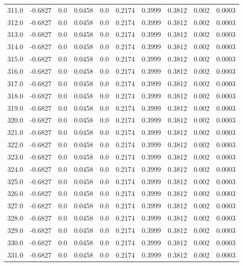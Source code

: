 \begin{longtable}{lrrrrrrrrr}
311.0 & -0.6827 & 0.0 & 0.0458 & 0.0 & 0.2174 & 0.3999 & 0.3812 & 0.002 & 0.0003 \\
312.0 & -0.6827 & 0.0 & 0.0458 & 0.0 & 0.2174 & 0.3999 & 0.3812 & 0.002 & 0.0003 \\
313.0 & -0.6827 & 0.0 & 0.0458 & 0.0 & 0.2174 & 0.3999 & 0.3812 & 0.002 & 0.0003 \\
314.0 & -0.6827 & 0.0 & 0.0458 & 0.0 & 0.2174 & 0.3999 & 0.3812 & 0.002 & 0.0003 \\
315.0 & -0.6827 & 0.0 & 0.0458 & 0.0 & 0.2174 & 0.3999 & 0.3812 & 0.002 & 0.0003 \\
316.0 & -0.6827 & 0.0 & 0.0458 & 0.0 & 0.2174 & 0.3999 & 0.3812 & 0.002 & 0.0003 \\
317.0 & -0.6827 & 0.0 & 0.0458 & 0.0 & 0.2174 & 0.3999 & 0.3812 & 0.002 & 0.0003 \\
318.0 & -0.6827 & 0.0 & 0.0458 & 0.0 & 0.2174 & 0.3999 & 0.3812 & 0.002 & 0.0003 \\
319.0 & -0.6827 & 0.0 & 0.0458 & 0.0 & 0.2174 & 0.3999 & 0.3812 & 0.002 & 0.0003 \\
320.0 & -0.6827 & 0.0 & 0.0458 & 0.0 & 0.2174 & 0.3999 & 0.3812 & 0.002 & 0.0003 \\
321.0 & -0.6827 & 0.0 & 0.0458 & 0.0 & 0.2174 & 0.3999 & 0.3812 & 0.002 & 0.0003 \\
322.0 & -0.6827 & 0.0 & 0.0458 & 0.0 & 0.2174 & 0.3999 & 0.3812 & 0.002 & 0.0003 \\
323.0 & -0.6827 & 0.0 & 0.0458 & 0.0 & 0.2174 & 0.3999 & 0.3812 & 0.002 & 0.0003 \\
324.0 & -0.6827 & 0.0 & 0.0458 & 0.0 & 0.2174 & 0.3999 & 0.3812 & 0.002 & 0.0003 \\
325.0 & -0.6827 & 0.0 & 0.0458 & 0.0 & 0.2174 & 0.3999 & 0.3812 & 0.002 & 0.0003 \\
326.0 & -0.6827 & 0.0 & 0.0458 & 0.0 & 0.2174 & 0.3999 & 0.3812 & 0.002 & 0.0003 \\
327.0 & -0.6827 & 0.0 & 0.0458 & 0.0 & 0.2174 & 0.3999 & 0.3812 & 0.002 & 0.0003 \\
328.0 & -0.6827 & 0.0 & 0.0458 & 0.0 & 0.2174 & 0.3999 & 0.3812 & 0.002 & 0.0003 \\
329.0 & -0.6827 & 0.0 & 0.0458 & 0.0 & 0.2174 & 0.3999 & 0.3812 & 0.002 & 0.0003 \\
330.0 & -0.6827 & 0.0 & 0.0458 & 0.0 & 0.2174 & 0.3999 & 0.3812 & 0.002 & 0.0003 \\
331.0 & -0.6827 & 0.0 & 0.0458 & 0.0 & 0.2174 & 0.3999 & 0.3812 & 0.002 & 0.0003 \\

\end{longtable}
